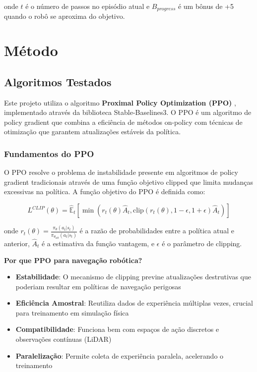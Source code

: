 \documentclass[9pt,a4paper,twoside]{tau}
\begin{document}
onde $t$ é o número de passos no episódio atual e $B_{progress}$ é um bônus de +5 quando o robô se aproxima do objetivo.

\section{Método}

\subsection{Algoritmos Testados}

Este projeto utiliza o algoritmo \textbf{Proximal Policy Optimization (PPO)} \cite{schu2017}, implementado através da biblioteca Stable-Baselines3. O PPO é um algoritmo de policy gradient que combina a eficiência de métodos on-policy com técnicas de otimização que garantem atualizações estáveis da política.

\subsubsection{Fundamentos do PPO}

O PPO resolve o problema de instabilidade presente em algoritmos de policy gradient tradicionais através de uma função objetivo clipped que limita mudanças excessivas na política. A função objetivo do PPO é definida como:

\begin{equation} \label{ec:ppo_objective}
L^{CLIP}(\theta) = \hat{\mathbb{E}}_t \left[ \min(r_t(\theta)\hat{A}_t, \text{clip}(r_t(\theta), 1-\epsilon, 1+\epsilon)\hat{A}_t) \right]
\end{equation}

onde $r_t(\theta) = \frac{\pi_\theta(a_t|s_t)}{\pi_{\theta_{old}}(a_t|s_t)}$ é a razão de probabilidades entre a política atual e anterior, $\hat{A}_t$ é a estimativa da função vantagem, e $\epsilon$ é o parâmetro de clipping.

\textbf{Por que PPO para navegação robótica?}

\begin{itemize}
    \item \textbf{Estabilidade}: O mecanismo de clipping previne atualizações destrutivas que poderiam resultar em políticas de navegação perigosas
    \item \textbf{Eficiência Amostral}: Reutiliza dados de experiência múltiplas vezes, crucial para treinamento em simulação física
    \item \textbf{Compatibilidade}: Funciona bem com espaços de ação discretos e observações contínuas (LiDAR)
    \item \textbf{Paralelização}: Permite coleta de experiência paralela, acelerando o treinamento
\end{itemize}
\end{document}
